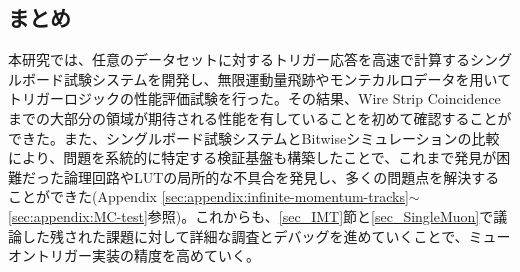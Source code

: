 \subsection*{まとめ}
本研究では、任意のデータセットに対するトリガー応答を高速で計算するシングルボード試験システムを開発し、無限運動量飛跡やモンテカルロデータを用いてトリガーロジックの性能評価試験を行った。その結果、Wire Strip Coincidenceまでの大部分の領域が期待される性能を有していることを初めて確認することができた。また、シングルボード試験システムとBitwiseシミュレーションの比較により、問題を系統的に特定する検証基盤も構築したことで、これまで発見が困難だった論理回路やLUTの局所的な不具合を発見し、多くの問題点を解決することができた(Appendix \ref{sec:appendix:infinite-momentum-tracks}$\sim$ \ref{sec:appendix:MC-test}参照)。これからも、\ref{sec_IMT}節と\ref{sec_SingleMuon}で議論した残された課題に対して詳細な調査とデバッグを進めていくことで、ミューオントリガー実装の精度を高めていく。



